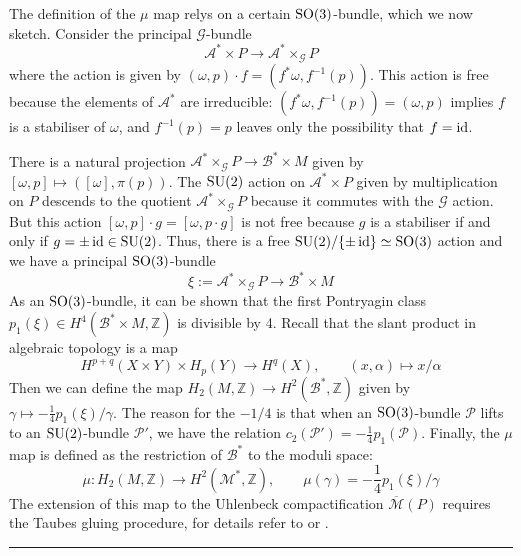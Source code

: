 The definition of the $\mu$ map relys on a certain $\operatorname{SO}(3)$-bundle, which we now
sketch.  Consider the principal $\mathcal{G}$-bundle
\[
\mathcal{A}^* \times P  \to \mathcal{A}^* \times_\mathcal{G} P 
\]
where the action is given by $(\omega,p)\cdot f = (f^*\omega, f^{-1}(p))$.
This action is free because the elements of $\mathcal{A}^*$ are irreducible:
$(f^*\omega,f^{-1}(p)) = (\omega,p)$ implies $f$ is a stabiliser of  $\omega$,
and  $f^{-1}(p)=p$ leaves only the possibility that $f=\operatorname{id}$.

There is a natural projection $\mathcal{A}^* \times_\mathcal{G} P \to
\mathcal{B}^*\times M$ given by $[\omega,p] \mapsto ([\omega],\pi(p))$.
The $\operatorname{SU}(2)$ action on  $\mathcal{A}^*\times P$ given by multiplication on $P$
descends to the quotient $\mathcal{A}^* \times_\mathcal{G} P$ because it 
commutes with the  $\mathcal{G}$ action.
But this action $[\omega,p]\cdot g = [\omega,p\cdot g]$ is not free because 
$g$ is a stabiliser if and only if $g=\pm \operatorname{id}\in \operatorname{SU}(2)$. Thus, there is a free
$\operatorname{SU}(2) /\{\pm\operatorname{id}\} \simeq \operatorname{SO}(3)$ action and we have a principal $\operatorname{SO}(3)$-bundle
\[
\xi := \mathcal{A}^*\times_{\mathcal{G}} P \to \mathcal{B}^*\times M
\] 
As an $\operatorname{SO}(3)$-bundle, it can be shown that the first Pontryagin class
$p_1(\xi) \in H^4(\mathcal{B}^*\times M,\mathbb{Z})$ is divisible by
4.\cite[Lemma 7.2.1]{morgan} 
Recall that the slant product in algebraic topology is a map 
\[
H^{p+q}(X\times Y) \times H_p(Y) \to H^q(X), \qquad 
(x,\alpha) \mapsto x / \alpha
\] 
Then we can define the map $H_2(M,\mathbb{Z})\to H^2(\mathcal{B}^*,\mathbb{Z})$
given by $\gamma \mapsto -\frac{1}{4} p_1(\xi) / \gamma$. 
The reason for the $-1 /4$ is
that when an $\operatorname{SO}(3)$-bundle $\mathcal{P}$ lifts  to an $\operatorname{SU}(2)$-bundle
$\mathcal{P}'$, we have the relation %
$c_2(\mathcal{P}')=-\frac{1}{4}p_1(\mathcal{P})$. Finally, the $\mu$ map is
defined as the restriction of $\mathcal{B}^*$ to the moduli space:
 \[
\mu : H_2(M,\mathbb{Z}) \to H^2(\mathcal{M}^*,\mathbb{Z}),\qquad
\mu(\gamma) = -\frac{1}{4}p_1(\xi) /\gamma
\] 
The extension of this map to the Uhlenbeck compactification 
$\overline{\mathcal{M}}(P)$ requires the Taubes
gluing procedure, for details refer to \cite{morgan} or \cite{donaldson_kronheimer}.




\vspace{5mm}
\hrule 
\vspace{5mm}

\begin{comment}
		\item A great overview of the main ideas in the two approaches to
		constructing a Witten type TFT is given in \citet{TQFTbook}.
\end{comment}

